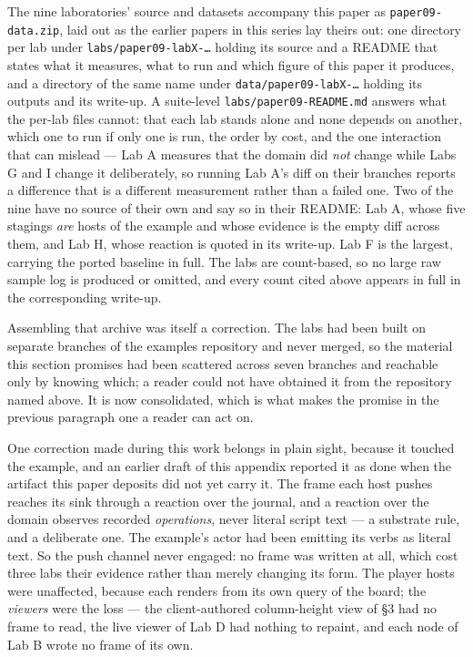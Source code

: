 \documentclass[
]{article}
\newcounter{none} %
\begin{document}
The nine laboratories' source and datasets accompany this paper as
\texttt{paper09-data.zip}, laid out as the earlier papers in this series
lay theirs out: one directory per lab under \texttt{labs/paper09-labX-…}
holding its source and a README that states what it measures, what to
run and which figure of this paper it produces, and a directory of the
same name under \texttt{data/paper09-labX-…} holding its outputs and its
write-up. A suite-level \texttt{labs/paper09-README.md} answers what the
per-lab files cannot: that each lab stands alone and none depends on
another, which one to run if only one is run, the order by cost, and the
one interaction that can mislead --- Lab A measures that the domain did
\emph{not} change while Labs G and I change it deliberately, so running
Lab A's diff on their branches reports a difference that is a different
measurement rather than a failed one. Two of the nine have no source of
their own and say so in their README: Lab A, whose five stagings
\emph{are} hosts of the example and whose evidence is the empty diff
across them, and Lab H, whose reaction is quoted in its write-up. Lab F
is the largest, carrying the ported baseline in full. The labs are
count-based, so no large raw sample log is produced or omitted, and
every count cited above appears in full in the corresponding write-up.

Assembling that archive was itself a correction. The labs had been built
on separate branches of the examples repository and never merged, so the
material this section promises had been scattered across seven branches
and reachable only by knowing which; a reader could not have obtained it
from the repository named above. It is now consolidated, which is what
makes the promise in the previous paragraph one a reader can act on.

One correction made during this work belongs in plain sight, because it
touched the example, and an earlier draft of this appendix reported it
as done when the artifact this paper deposits did not yet carry it. The
frame each host pushes reaches its sink through a reaction over the
journal, and a reaction over the domain observes recorded
\emph{operations}, never literal script text --- a substrate rule, and a
deliberate one. The example's actor had been emitting its verbs as
literal text. So the push channel never engaged: no frame was written at
all, which cost three labs their evidence rather than merely changing
its form. The player hosts were unaffected, because each renders from
its own query of the board; the \emph{viewers} were the loss --- the
client-authored column-height view of §3 had no frame to read, the live
viewer of Lab D had nothing to repaint, and each node of Lab B wrote no
frame of its own.
\end{document}

